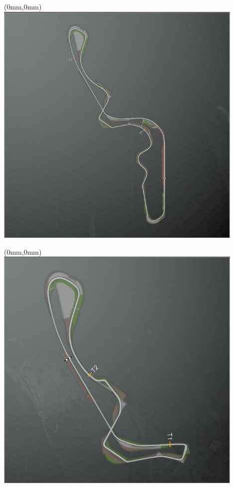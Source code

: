 \null\newpage
\begin{textblock*}{30mm}(0mm,0mm)%
\includegraphics[width=120mm]{TR/2015-05-20_00052.png}
\end{textblock*}
\null\newpage
\begin{textblock*}{30mm}(0mm,0mm)%
\includegraphics[width=120mm]{TR/2015-05-20_00054.png}
\end{textblock*}
